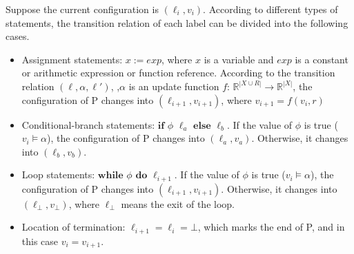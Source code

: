 \documentclass[runningheads]{llncs}
\newcommand\yx[1]{{\color{red} [YD: #1]}}
\begin{document}
Suppose the current configuration is $(\ell_i, v_i)$. According to different types of statements, the transition relation of each label can be divided into the following cases. 
\renewcommand{\labelitemi}{$\vcenter{\hbox{\tiny$\bullet$}}$}
\begin{itemize}
	\item  Assignment statements: $x:=exp$, where $x$ is a variable and $exp$ is a constant or arithmetic expression or function reference. According to the transition relation $(\ell, \alpha, \ell')$,
	,$\alpha$ is an update function $f$: $\mathbb{R}^{|X\cup R|}\to \mathbb{R}^{|X|}$,
	the configuration of P changes into $(\ell_{i+1}, v_{i+1})$, where $v_{i+1} = f(v_i,r)$
    \item  Conditional-branch statements: $\textbf{if}$ $\phi$ $\ell_a$ $\textbf{else}$ $\ell_b$. If the value of $\phi$ is true ($v_i \models \alpha$), 
    the configuration of P changes into $(\ell_a, v_a)$. Otherwise, it changes into $(\ell_b, v_b)$.
	\item  Loop statements: $\textbf{while}$ $\phi$ $\textbf{do}$ $\ell_{i+1}$. If the value of $\phi$ is true ($v_i \models \alpha$), the configuration of P changes into $(\ell_{i+1}, v_{i+1})$. Otherwise, it changes into $(\ell_{\bot}, v_{\bot})$, where $\ell_{\bot}$ means the exit of the loop.
	\item  Location of termination: $\ell_{i+1} =\ell_{i}=\bot$, which marks the end of P, and in this case $v_{i} = v_{i+1}$.
\end{itemize}
\end{document}

